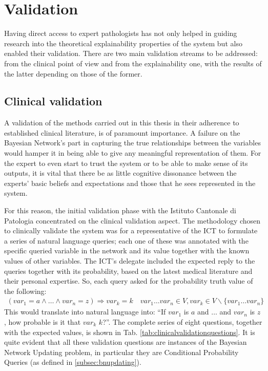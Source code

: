 \section{Validation}
Having direct access to expert pathologists has not only helped in guiding research into the theoretical explainability properties of the system but also enabled their validation.
There are two main validation streams to be addressed: from the clinical point of view and from the explainability one, with the results of the latter depending on those of the former.
 
\subsection{Clinical validation} 
A validation of the methods carried out in this thesis in their adherence to established clinical literature, is of paramount importance.
A failure on the Bayesian Network's part in capturing the true relationships between the variables would hamper it in being able to give any meaningful representation of them.
For the expert to even start to trust the system or to be able to make sense of its outputs, it is vital that there be as little cognitive dissonance between the experts' basic beliefs and expectations and those that he sees represented in the system.

For this reason, the initial validation phase with the Istituto Cantonale di Patologia concentrated on the clinical validation aspect.
The methodology chosen to clinically validate the system was for a representative of the ICT to formulate a series of natural language queries; each one of these was annotated with the specific queried variable in the network and its value together with the known values of other variables.
The ICT's delegate included the expected reply to the queries together with its probability, based on the latest medical literature and their personal expertise.
So, each query asked for the probability truth value of the following:
\begin{align}
	(var_1 = a \wedge \ldots \wedge var_n = z ) \Rightarrow var_k = k \quad var_1 \ldots var_n \in V, var_k \in V \smallsetminus \{ var_1 \ldots var_n \}
\end{align}
This would translate into natural language into:
\enquote{If $var_1$ is $a$ and $\ldots$ and $var_n$ is $z$, how probable is it that $var_k$ $k$?}.
The complete series of eight questions, together with the expected values, is shown in Tab. \ref{tab:clinicalvalidationquestions}.
It is quite evident that all these validation questions are instances of the Bayesian Network Updating problem, in particular they are Conditional Probability Queries (as defined in \ref{subsec:bnupdating}).

